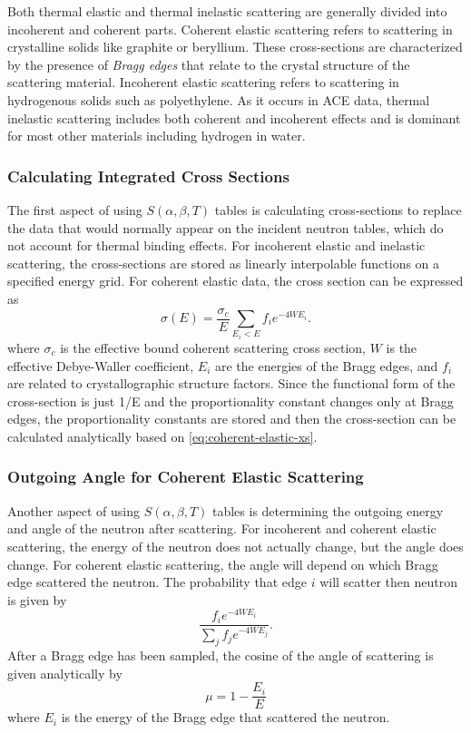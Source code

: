 Both thermal elastic and thermal inelastic scattering are generally divided into
incoherent and coherent parts. Coherent elastic scattering refers to scattering
in crystalline solids like graphite or beryllium. These cross-sections are
characterized by the presence of \emph{Bragg edges} that relate to the crystal
structure of the scattering material. Incoherent elastic scattering refers to
scattering in hydrogenous solids such as polyethylene. As it occurs in ACE data,
thermal inelastic scattering includes both coherent and incoherent effects and
is dominant for most other materials including hydrogen in water.

\subsubsection{Calculating Integrated Cross Sections}

The first aspect of using $S(\alpha,\beta,T)$ tables is calculating
cross-sections to replace the data that would normally appear on the incident
neutron tables, which do not account for thermal binding effects. For incoherent
elastic and inelastic scattering, the cross-sections are stored as linearly
interpolable functions on a specified energy grid. For coherent elastic data,
the cross section can be expressed as
\begin{equation}
  \label{eq:coherent-elastic-xs}
  \sigma(E) = \frac{\sigma_c}{E} \sum_{E_i < E} f_i e^{-4WE_i}.
\end{equation}
where $\sigma_c$ is the effective bound coherent scattering cross section, $W$
is the effective Debye-Waller coefficient, $E_i$ are the energies of the Bragg
edges, and $f_i$ are related to crystallographic structure factors. Since the
functional form of the cross-section is just 1/E and the proportionality
constant changes only at Bragg edges, the proportionality constants are stored
and then the cross-section can be calculated analytically based on
\eqref{eq:coherent-elastic-xs}.

\subsubsection{Outgoing Angle for Coherent Elastic Scattering}

Another aspect of using $S(\alpha,\beta,T)$ tables is determining the outgoing
energy and angle of the neutron after scattering. For incoherent and coherent
elastic scattering, the energy of the neutron does not actually change, but the
angle does change. For coherent elastic scattering, the angle will depend on
which Bragg edge scattered the neutron. The probability that edge $i$ will
scatter then neutron is given by
\begin{equation}
  \label{eq:coherent-elastic-probability}
  \frac{f_i e^{-4WE_i}}{\sum_j f_j e^{-4WE_j}}.
\end{equation}
After a Bragg edge has been sampled, the cosine of the angle of scattering is
given analytically by
\begin{equation}
  \label{eq:coherent-elastic-angle}
  \mu = 1 - \frac{E_i}{E}
\end{equation}
where $E_i$ is the energy of the Bragg edge that scattered the neutron. 


